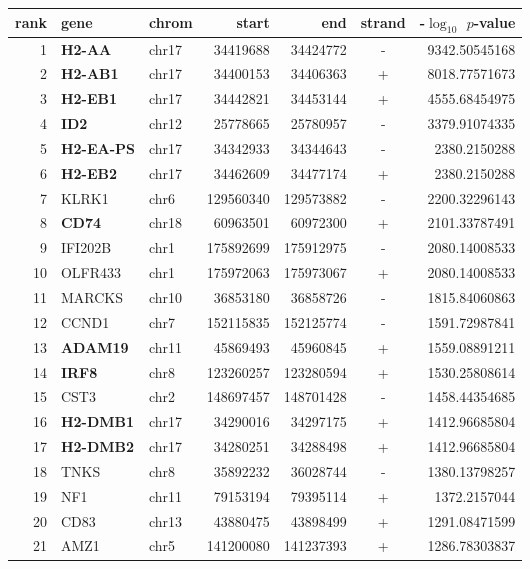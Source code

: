 \clearpage
\newpage
\begin{table}
\small \centering 
 \begin{tabular}{rllrrcr}
rank & gene & chrom & start & end & strand & -$\log_{10}$ $p$-value \\\hline
1 & \textbf{H2-AA} & chr17 & 34419688 & 34424772 & - & 9342.50545168 \\
2 & \textbf{H2-AB1} & chr17 & 34400153 & 34406363 & + & 8018.77571673 \\
3 & \textbf{H2-EB1} & chr17 & 34442821 & 34453144 & + & 4555.68454975 \\
4 & \textbf{ID2} & chr12 & 25778665 & 25780957 & - & 3379.91074335 \\
5 & \textbf{H2-EA-PS} & chr17 & 34342933 & 34344643 & - & 2380.2150288 \\
6 & \textbf{H2-EB2} & chr17 & 34462609 & 34477174 & + & 2380.2150288 \\
7 & KLRK1 & chr6 & 129560340 & 129573882 & - & 2200.32296143 \\
8 & \textbf{CD74} & chr18 & 60963501 & 60972300 & + & 2101.33787491 \\
9 & IFI202B & chr1 & 175892699 & 175912975 & - & 2080.14008533 \\
10 & OLFR433 & chr1 & 175972063 & 175973067 & + & 2080.14008533 \\
11 & MARCKS & chr10 & 36853180 & 36858726 & - & 1815.84060863 \\
12 & CCND1 & chr7 & 152115835 & 152125774 & - & 1591.72987841 \\
13 & \textbf{ADAM19} & chr11 & 45869493 & 45960845 & + & 1559.08891211 \\
14 & \textbf{IRF8} & chr8 & 123260257 & 123280594 & + & 1530.25808614 \\
15 & CST3 & chr2 & 148697457 & 148701428 & - & 1458.44354685 \\
16 & \textbf{H2-DMB1} & chr17 & 34290016 & 34297175 & + & 1412.96685804 \\
17 & \textbf{H2-DMB2} & chr17 & 34280251 & 34288498 & + & 1412.96685804 \\
18 & TNKS & chr8 & 35892232 & 36028744 & - & 1380.13798257 \\
19 & NF1 & chr11 & 79153194 & 79395114 & + & 1372.2157044 \\
20 & CD83 & chr13 & 43880475 & 43898499 & + & 1291.08471599 \\
21 & AMZ1 & chr5 & 141200080 & 141237393 & + & 1286.78303837 \\

\end{tabular}
\end{table}
